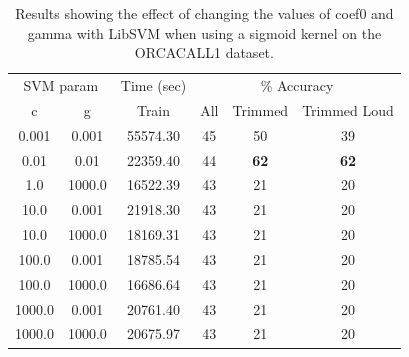 \begin{table}
\begin{tabular}{|c|c|c|c|c|c|}
\hline
\multicolumn{2}{|c|}{SVM param} & \multicolumn{1}{c|}{Time (sec)} & \multicolumn{3}{c|}{\% Accuracy} \\
\hhline{|-|-|-|-|-|-|}
c & g  & Train & All & Trimmed & Trimmed Loud \\
\hhline{|=|=|=|=|=|=|}
0.001  & 0.001   &  55574.30  &    45 & 50 & 39 \\
0.01   & 0.01    &  22359.40  &    44 & \textbf{62} & \textbf{62} \\
1.0    & 1000.0  &  16522.39  &    43 & 21 & 20 \\
10.0   & 0.001   &  21918.30  &    43 & 21 & 20 \\
10.0   & 1000.0  &  18169.31  &    43 & 21 & 20 \\
100.0  & 0.001   &  18785.54  &    43 & 21 & 20 \\
100.0  & 1000.0  &  16686.64  &    43 & 21 & 20 \\
1000.0 & 0.001   &  20761.40  &    43 & 21 & 20 \\
1000.0 & 1000.0  &  20675.97  &    43 & 21 & 20 \\
\hline
\end{tabular}
\caption{Results showing the effect of changing the
  values of coef0 and gamma with LibSVM when using a sigmoid kernel on
  the ORCACALL1 dataset.}
\label{table:calls-libsvm-sigmoid}
\end{table}

